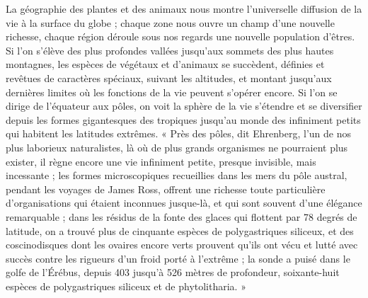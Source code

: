 \documentclass[a4paper, 11pt, oneside]{article}
\begin{document}
La géographie des plantes et des animaux nous montre l'universelle diffusion de la vie à la surface du globe ; chaque zone nous ouvre un champ d'une nouvelle richesse, chaque région déroule sous nos regards une nouvelle population d'êtres. Si l'on s'élève des plus profondes vallées jusqu'aux sommets des plus hautes montagnes, les espèces de végétaux et d'animaux se succèdent, définies et revêtues de caractères spéciaux, suivant les altitudes, et montant jusqu'aux dernières limites où les fonctions de la vie peuvent s'opérer encore. Si l'on se dirige de l'équateur aux pôles, on voit la sphère de la vie s'étendre et se diversifier depuis les formes gigantesques des tropiques jusqu'au monde des infiniment petits qui habitent les latitudes extrêmes. « Près des pôles, dit Ehrenberg, l'un de nos plus laborieux naturalistes, là où de plus grands organismes ne pourraient plus exister, il règne encore une vie infiniment petite, presque invisible, mais incessante ; les formes microscopiques recueillies dans les mers du pôle austral, pendant les voyages de James Ross, offrent une richesse toute particulière d'organisations qui étaient inconnues jusque-là, et qui sont souvent d'une élégance remarquable ; dans les résidus de la fonte des glaces qui flottent par 78 degrés de latitude, on a trouvé plus de cinquante espèces de polygastriques siliceux, et des coscinodisques dont les ovaires encore verts prouvent qu'ils ont vécu et lutté avec succès contre les rigueurs d'un froid porté à l'extrême ; la sonde a puisé dans le golfe de l'Érébus, depuis 403 jusqu'à 526 mètres de profondeur, soixante-huit espèces de polygastriques siliceux et de phytolitharia. »
\end{document}
